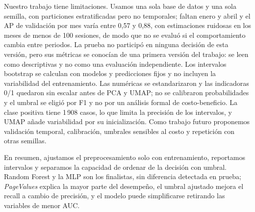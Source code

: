 \documentclass[journal]{IEEEtran}
\begin{document}
Nuestro trabajo tiene limitaciones. Usamos una sola base de datos y una sola semilla, con
particiones estratificadas pero no temporales; faltan enero y abril y el AP de validación
por mes varía entre 0,57 y 0,88, con estimaciones ruidosas en los meses de menos de 100
sesiones, de modo que no se evaluó si el comportamiento cambia entre periodos. La prueba no participó en
ninguna decisión de esta versión, pero sus métricas se conocían de una primera versión del
trabajo: se leen como descriptivas y no como una evaluación independiente. Los intervalos
bootstrap se calculan con modelos y predicciones fijos y no incluyen la variabilidad
del entrenamiento. Las numéricas se estandarizaron y las indicadoras 0/1 quedaron sin
escalar antes de PCA y UMAP; no se calibraron probabilidades y el umbral se eligió por F1
y no por un análisis formal de costo-beneficio. La clase positiva tiene 1\,908 casos, lo que limita la precisión de los
intervalos, y UMAP añade variabilidad por su inicialización. Como trabajo futuro
proponemos validación temporal, calibración, umbrales sensibles al costo y repetición con
otras semillas.

En resumen, ajustamos el preprocesamiento solo con entrenamiento, reportamos
intervalos y separamos la capacidad de ordenar de la decisión con umbral. Random Forest y la MLP son los finalistas,
sin diferencia detectada en prueba; \textit{PageValues} explica la mayor parte del
desempeño, el umbral ajustado mejora el recall a cambio de precisión, y el modelo puede
simplificarse retirando las variables de menor AUC.

\FloatBarrier
\end{document}
